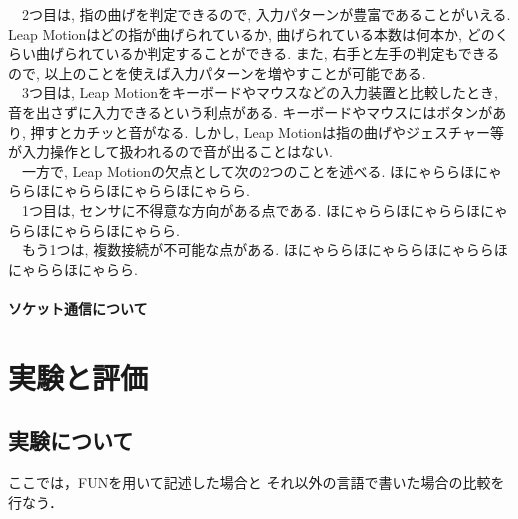 \documentclass{funthesis}
\begin{document}
　2つ目は, 指の曲げを判定できるので, 入力パターンが豊富であることがいえる. Leap Motionはどの指が曲げられているか, 曲げられている本数は何本か, どのくらい曲げられているか判定することができる. また, 右手と左手の判定もできるので, 以上のことを使えば入力パターンを増やすことが可能である. \\
　3つ目は, Leap Motionをキーボードやマウスなどの入力装置と比較したとき, 音を出さずに入力できるという利点がある. キーボードやマウスにはボタンがあり, 押すとカチッと音がなる. しかし, Leap Motionは指の曲げやジェスチャー等が入力操作として扱われるので音が出ることはない. \\
　一方で, Leap Motionの欠点として次の2つのことを述べる. ほにゃららほにゃららほにゃららほにゃららほにゃらら.\\
　1つ目は, センサに不得意な方向がある点である. ほにゃららほにゃららほにゃららほにゃららほにゃらら.\\
　もう1つは, 複数接続が不可能な点がある. ほにゃららほにゃららほにゃららほにゃららほにゃらら.\\

\subsubsection{ソケット通信について}



\chapter{実験と評価}

\section{実験について}

ここでは，FUNを用いて記述した場合と
それ以外の言語で書いた場合の比較を行なう．


\end{document}
